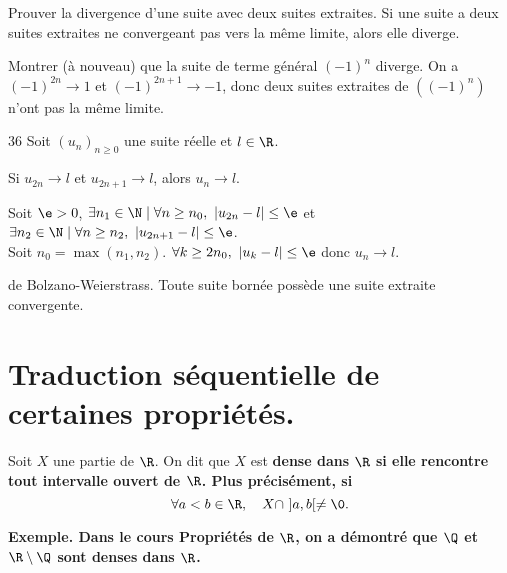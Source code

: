 \documentclass[11pt]{article}
\begin{document}
\begin{meth}{Prouver la divergence d'une suite avec deux suites extraites.}{}
    Si une suite a deux suites extraites ne convergeant pas vers la même limite, alors elle diverge.
\end{meth}

\begin{ex}{}{}
    Montrer (à nouveau) que la suite de terme général $(-1)^n$ diverge.
    \tcblower
    On a $(-1)^{2n}\to 1$ et $(-1)^{2n+1}\to-1$, donc deux suites extraites de $((-1)^n)$ n'ont pas la même limite.
\end{ex}

\begin{prop}{}{36}
    Soit $(u_n)_{n\geq0}$ une suite réelle et $l\in\R$.
    \begin{center}
        Si $u_{2n}\to l$ et $u_{2n+1}\to l$, alors $u_n \to l$.
    \end{center}
    \tcblower
    Soit $\e>0$, $\exists n_1 \in \N \mid \forall n \geq n_0, ~ |u_{2n}-l|\leq\e$ et $\exists n_2 \in \N \mid \forall n \geq n_2, ~ |u_{2n+1}-l|\leq\e$.\\
    Soit $n_0=\max(n_1,n_2)$. $\forall k \geq 2n_0, ~ |u_k - l| \leq \e$ donc $u_n\to l$.
\end{prop}

\begin{thm}{de Bolzano-Weierstrass.}{}
    Toute suite bornée possède une suite extraite convergente.
\end{thm}

\section{Traduction séquentielle de certaines propriétés.}

\begin{defi}{}{}
    Soit $X$ une partie de $\R$. On dit que $X$ est \bf{dense} dans $\R$ si elle rencontre tout intervalle ouvert de $\R$. Plus précisément, si
    \begin{equation*}
        \forall a < b \in \R, \quad X\cap~]a,b[\neq\0.
    \end{equation*}
\end{defi}

\bf{Exemple.} Dans le cours Propriétés de $\R$, on a démontré que $\Q$ et $\R\setminus\Q$ sont denses dans $\R$.

\pagebreak
\end{document}
